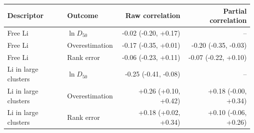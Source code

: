 \begin{tabular}{llrr}
\toprule
Descriptor & Outcome & Raw correlation & Partial correlation \\
\midrule
Free Li & $\ln D_{50}$ & -0.02 (-0.20, +0.17) & -- \\
Free Li & Overestimation & -0.17 (-0.35, +0.01) & -0.20 (-0.35, -0.03) \\
Free Li & Rank error & -0.06 (-0.23, +0.11) & -0.07 (-0.22, +0.10) \\
Li in large clusters & $\ln D_{50}$ & -0.25 (-0.41, -0.08) & -- \\
Li in large clusters & Overestimation & +0.26 (+0.10, +0.42) & +0.18 (-0.00, +0.34) \\
Li in large clusters & Rank error & +0.18 (+0.02, +0.34) & +0.10 (-0.06, +0.26) \\
\bottomrule
\end{tabular}
